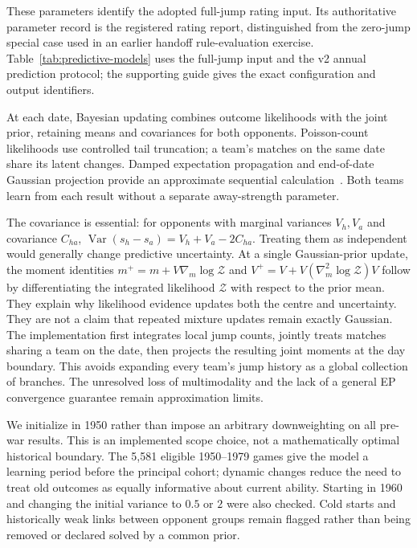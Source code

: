 These parameters identify the adopted full-jump rating input. Its authoritative parameter record is the registered rating report, distinguished from the zero-jump special case used in an earlier handoff rule-evaluation exercise. Table~\ref{tab:predictive-models} uses the full-jump input and the v2 annual prediction protocol; the supporting guide gives the exact configuration and output identifiers.

At each date, Bayesian updating combines outcome likelihoods with the joint prior, retaining means and covariances for both opponents. Poisson-count likelihoods use controlled tail truncation; a team's matches on the same date share its latent changes. Damped expectation propagation and end-of-date Gaussian projection provide an approximate sequential calculation~\cite{minka2001ep}. Both teams learn from each result without a separate away-strength parameter.

The covariance is essential: for opponents with marginal variances $V_h,V_a$ and covariance $C_{ha}$, $\operatorname{Var}(s_h-s_a)=V_h+V_a-2C_{ha}$. Treating them as independent would generally change predictive uncertainty. At a single Gaussian-prior update, the moment identities $m^+=m+V\nabla_m\log\mathcal Z$ and $V^+=V+V(\nabla_m^2\log\mathcal Z)V$ follow by differentiating the integrated likelihood $\mathcal Z$ with respect to the prior mean. They explain why likelihood evidence updates both the centre and uncertainty. They are not a claim that repeated mixture updates remain exactly Gaussian. The implementation first integrates local jump counts, jointly treats matches sharing a team on the date, then projects the resulting joint moments at the day boundary. This avoids expanding every team's jump history as a global collection of branches. The unresolved loss of multimodality and the lack of a general EP convergence guarantee remain approximation limits.

We initialize in 1950 rather than impose an arbitrary downweighting on all pre-war results. This is an implemented scope choice, not a mathematically optimal historical boundary. The 5,581 eligible 1950--1979 games give the model a learning period before the principal cohort; dynamic changes reduce the need to treat old outcomes as equally informative about current ability. Starting in 1960 and changing the initial variance to $0.5$ or $2$ were also checked. Cold starts and historically weak links between opponent groups remain flagged rather than being removed or declared solved by a common prior.

